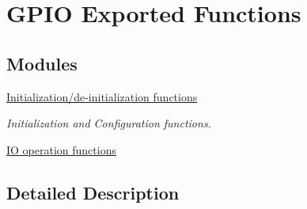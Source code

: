 \hypertarget{group___g_p_i_o___exported___functions}{}\section{G\+P\+IO Exported Functions}
\label{group___g_p_i_o___exported___functions}
\subsection*{Modules}
\begin{DoxyCompactItemize}
\item 
\hyperlink{group___g_p_i_o___exported___functions___group1}{Initialization/de-\/initialization functions}
\begin{DoxyCompactList}\small\item\em Initialization and Configuration functions. \end{DoxyCompactList}\item 
\hyperlink{group___g_p_i_o___exported___functions___group2}{I\+O operation functions}
\end{DoxyCompactItemize}


\subsection{Detailed Description}
